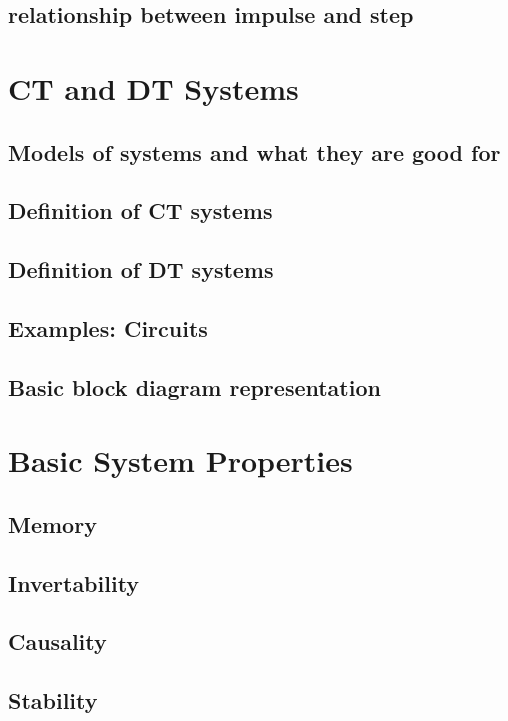 \documentclass{article}
\begin{document}
\subsection{relationship between impulse and step}
\label{sec:org055e977}

\newpage
\section{CT and DT Systems}
\label{sec:org7f962be}
\subsection{Models of systems and what they are good for}
\label{sec:org630c08b}
\subsection{Definition of CT systems}
\label{sec:org4c0c08a}
\subsection{Definition of DT systems}
\label{sec:org93604c1}
\subsection{Examples: Circuits}
\label{sec:org787bf61}
\subsection{Basic block diagram representation}
\label{sec:orgb2e3c34}

\newpage
\section{Basic System Properties}
\label{sec:org4a5eb76}
\subsection{Memory}
\label{sec:org11a1ea9}
\subsection{Invertability}
\label{sec:org73bcf64}
\subsection{Causality}
\label{sec:org4314405}
\subsection{Stability}
\label{sec:orgdf1ed25}
\end{document}
